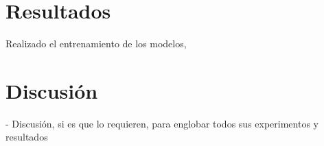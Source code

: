 \section{Resultados}
Realizado el entrenamiento de los modelos, 



\section{Discusión}

- Discusión, si es que lo requieren, para englobar todos sus experimentos y resultados
